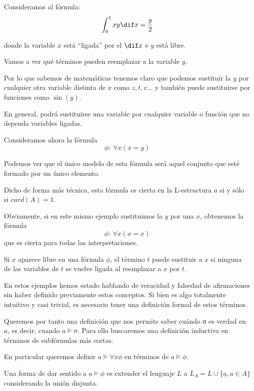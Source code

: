 \begin{example}

Consideramos al fórmula:
\[\int_0^1 xy \dif x = \frac{y}{2}\]

donde la variable $x$ está ``ligada'' por el $\dif x$ e $y$ está libre.

Vamos a ver qué términos pueden reemplazar a la variable $y$.

Por lo que sabemos de matemáticas tenemos claro que podemos sustituir la $y$ por cualquier otra variable distinta de $x$ como $z,t,v...$ y también puede sustituirse por funciones como $\sin(y)$.

En general, podrá sustituirse una variable por cualquier variable o función que no dependa variables ligadas.
\end{example}

\begin{example}
Consideramos ahora la fórmula
\[\phi: \ \forall x (x=y)\]

Podemos ver que el único modelo de esta fórmula será aquel conjunto que esté formado por un único elemento.

Dicho de forma más técnica, esta fórmula es cierta en la L-estructura $a$ si y sólo si $card(A)=1$.

Obviamente, si en este mismo ejemplo sustituimos la $y$ por una $x$, obtenemos la fórmula
\[\phi: \ \forall x (x=x)\]
que es cierta para todas las interpretaciones.
\end{example}

\begin{prop}
Si $x$ aparece libre en una fórmula $\phi$, el término $t$ puede sustituir a $x$ si ninguna de las variables de $t$ se vuelve ligada al reemplazar a $x$ por $t$.
\end{prop}

En estos ejemplos hemos estado hablando de veracidad y falsedad de afirmaciones sin haber definido previamente estos conceptos. Si bien es algo totalmente intuitivo y casi trivial, es necesario tener una definición formal de estos términos. 

Queremos por tanto una definición que nos permite saber cuándo σ es verdad en $a$, es decir, cuando $a\vDash σ$. Para ello buscaremos una definición inductiva en términos de subfórmulas más cortas.

En particular queremos definir $a \vDash \forall x \phi$ en términos de $a \vDash \phi$.

Una forma de dar sentido a $a\vDash \phi$ es extender el lenguaje $L$ a  $L_A=L\cup\{\underline{a}, a \in A\}$ considerando la unión disjunta.

